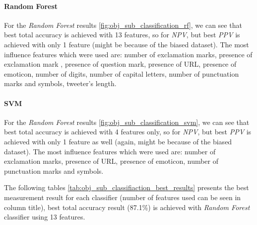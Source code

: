 \documentclass[letterpaper,twocolumn,10pt]{article}
\begin{document}
\paragraph{Random Forest} For the \textit{Random Forest} results \ref{fig:obj_sub_classification_rf}, we can see that best total accuracy is achieved with 13 features, so for \textit{NPV}, but best \textit{PPV} is achieved with only 1 feature (might be because of the biased dataset). The most influence features which were used are:
number of exclamation marks, presence of exclamation mark , presence of question mark, presence of URL, presence of emoticon, number of digits, number of capital letters, number of punctuation marks and symbols, tweeter's length.

\paragraph{SVM} For the \textit{Random Forest} results \ref{fig:obj_sub_classification_svm}, we can see that best total accuracy is achieved with 4 features only, so for \textit{NPV}, but best \textit{PPV} is achieved with only 1 feature as well (again, might be because of the biased dataset). The most influence features which were used are:
number of exclamation marks, presence of URL, presence of emoticon, number of punctuation marks and symbols.

The following tables \ref{tab:obj_sub_classifiaction_best_results} presents the best measurement result for each classifier (number of features used can be seen in column title), best total accuracy result (87.1\%) is achieved with \textit{Random Forest} classifier using 13 features. \\

\begin{table}[H]

	\begin{center}
	\end{center}
	\caption{Objective/Subjective Classification Best Results}
\label{tab:obj_sub_classifiaction_best_results}
\end{table}
\end{document}

